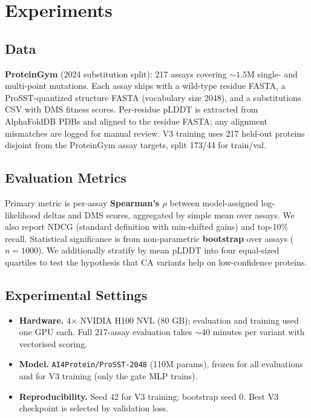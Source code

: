\documentclass[11pt,a4paper]{article}
\begin{document}
\section{Experiments}

\subsection{Data}
\textbf{ProteinGym} (2024 substitution split): 217 assays covering
$\sim\!1.5$M single- and multi-point mutations. Each assay ships with a
wild-type residue FASTA, a ProSST-quantized structure FASTA (vocabulary
size 2048), and a substitutions CSV with DMS fitness scores. Per-residue
pLDDT is extracted from AlphaFoldDB PDBs and aligned to the residue FASTA;
any alignment mismatches are logged for manual review. V3 training uses
217 held-out proteins disjoint from the ProteinGym assay targets, split
173/44 for train/val.

\subsection{Evaluation Metrics}
Primary metric is per-assay \textbf{Spearman's $\rho$} between model-assigned
log-likelihood deltas and DMS scores, aggregated by simple mean over assays.
We also report NDCG (standard definition with min-shifted gains) and
top-10\% recall. Statistical significance is from non-parametric
\textbf{bootstrap} over assays ($n{=}1000$). We additionally stratify by
mean pLDDT into four equal-sized quartiles to test the hypothesis that
CA variants help on low-confidence proteins.

\subsection{Experimental Settings}
\begin{itemize}[leftmargin=*]
\item \textbf{Hardware.} 4$\times$ NVIDIA H100 NVL (80 GB); evaluation and
training used one GPU each. Full 217-assay evaluation takes
$\sim\!40$ minutes per variant with vectorised scoring.
\item \textbf{Model.} \texttt{AI4Protein/ProSST-2048} (110M params), frozen
for all evaluations and for V3 training (only the gate MLP trains).
\item \textbf{Reproducibility.} Seed 42 for V3 training; bootstrap seed 0.
Best V3 checkpoint is selected by validation loss.
\end{itemize}
\end{document}
